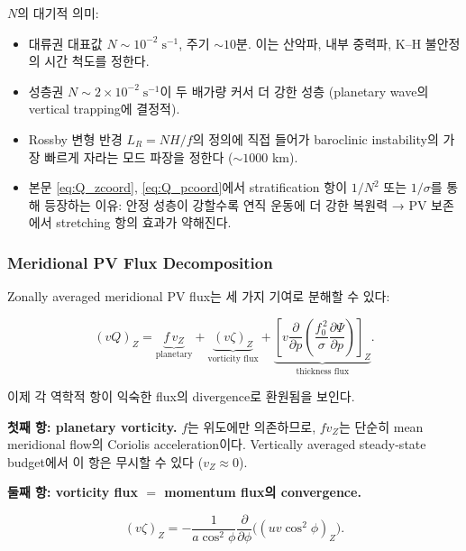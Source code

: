 \begin{hisublock}
$N$의 대기적 의미:
\begin{itemize}
  \item 대류권 대표값 $N \sim 10^{-2}\;\text{s}^{-1}$, 주기 $\sim 10$분.
        이는 산악파, 내부 중력파, K--H 불안정의 시간 척도를 정한다.
  \item 성층권 $N \sim 2\times 10^{-2}\;\text{s}^{-1}$이 두 배가량 커서 더 강한
        성층 (planetary wave의 vertical trapping에 결정적).
  \item Rossby 변형 반경 $L_R = NH/f$의 정의에 직접 들어가 baroclinic
        instability의 가장 빠르게 자라는 모드 파장을 정한다 ($\sim 1000$ km).
  \item 본문 \eqref{eq:Q_zcoord}, \eqref{eq:Q_pcoord}에서 stratification 항이
        $1/N^2$ 또는 $1/\sigma$를 통해 등장하는 이유: 안정 성층이 강할수록
        연직 운동에 더 강한 복원력 → PV 보존에서 stretching 항의 효과가
        약해진다.
\end{itemize}
\end{hisublock}

\subsubsection{Meridional PV Flux Decomposition}

Zonally averaged meridional PV flux는 세 가지 기여로 분해할 수 있다:

\begin{equation}\label{eq:vQ_decomp}
  (vQ)_Z = \underbrace{f\,v_Z}_{\text{planetary}}
    + \underbrace{(v\zeta)_Z}_{\text{vorticity flux}}
    + \underbrace{\left[v\frac{\partial}{\partial p}
      \left(\frac{f_0^{\,2}}{\sigma}\frac{\partial\Psi}{\partial p}
      \right)\right]_Z}_{\text{thickness flux}}.
\end{equation}

이제 각 역학적 항이 익숙한 flux의 divergence로 환원됨을 보인다.

\noindent\textbf{첫째 항: planetary vorticity.}\quad
$f$는 위도에만 의존하므로, $fv_Z$는 단순히 mean meridional flow의 Coriolis
acceleration이다.  Vertically averaged steady-state budget에서 이 항은
무시할 수 있다 ($v_Z \approx 0$).

\noindent\textbf{둘째 항: vorticity flux $=$ momentum flux의 convergence.}

\begin{proposition}
\begin{equation}\label{eq:vort_flux}
  (v\zeta)_Z
  = -\frac{1}{a\cos^2\phi}\frac{\partial}{\partial\phi}
    \bigl((uv\cos^2\phi)_Z\bigr).
\end{equation}
\end{proposition}

